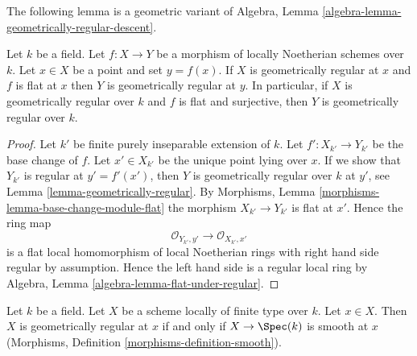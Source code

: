 \noindent
The following lemma is a geometric variant of
Algebra, Lemma \ref{algebra-lemma-geometrically-regular-descent}.

\begin{lemma}
\label{lemma-flat-under-geometrically-regular}
Let $k$ be a field.
Let $f : X \to Y$ be a morphism of locally Noetherian schemes over $k$.
Let $x \in X$ be a point and set $y = f(x)$.
If $X$ is geometrically regular at $x$ and
$f$ is flat at $x$ then $Y$ is geometrically regular at $y$.
In particular, if $X$ is geometrically regular over $k$ and
$f$ is flat and surjective, then $Y$ is geometrically regular over $k$.
\end{lemma}

\begin{proof}
Let $k'$ be finite purely inseparable extension of $k$.
Let $f' : X_{k'} \to Y_{k'}$ be the base change of $f$.
Let $x' \in X_{k'}$ be the unique point lying over $x$.
If we show that $Y_{k'}$ is regular at $y' = f'(x')$, then
$Y$ is geometrically regular over $k$ at $y'$, see
Lemma \ref{lemma-geometrically-regular}.
By
Morphisms, Lemma \ref{morphisms-lemma-base-change-module-flat}
the morphism $X_{k'} \to Y_{k'}$ is flat at $x'$.
Hence the ring map
$$
\mathcal{O}_{Y_{k'}, y'}
\longrightarrow
\mathcal{O}_{X_{k'}, x'}
$$
is a flat local homomorphism of local Noetherian rings with
right hand side regular by assumption. Hence the left hand side
is a regular local ring by
Algebra, Lemma \ref{algebra-lemma-flat-under-regular}.
\end{proof}

\begin{lemma}
\label{lemma-geometrically-regular-smooth}
Let $k$ be a field.
Let $X$ be a scheme locally of finite type over $k$.
Let $x \in X$.
Then $X$ is geometrically regular at $x$ if and only if $X \to \Spec(k)$
is smooth at $x$ (Morphisms, Definition \ref{morphisms-definition-smooth}).
\end{lemma}

